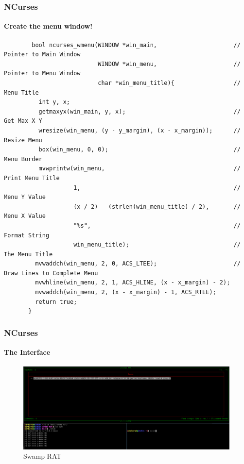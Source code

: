 \documentclass[aspectratio=169]{beamer}
\begin{document}
\begin{frame}[fragile]{}
  \frametitle{NCurses}
  \framesubtitle{Create the menu window!}
  \begin{center}
    \begin{tcolorbox}[title=net.c,colback=black]
    \begin{minipage}{0.5\textwidth}
      \begin{verbatim}
        bool ncurses_wmenu(WINDOW *win_main,                      // Pointer to Main Window
                           WINDOW *win_menu,                      // Pointer to Menu Window
                           char *win_menu_title){                 // Menu Title
          int y, x;
          getmaxyx(win_main, y, x);                               // Get Max X Y
          wresize(win_menu, (y - y_margin), (x - x_margin));      // Resize Menu
          box(win_menu, 0, 0);                                    // Menu Border
          mvwprintw(win_menu,                                     // Print Menu Title
                    1,                                            // Menu Y Value
                    (x / 2) - (strlen(win_menu_title) / 2),       // Menu X Value
                    "%s",                                         // Format String
                    win_menu_title);                              // The Menu Title
         mvwaddch(win_menu, 2, 0, ACS_LTEE);                      // Draw Lines to Complete Menu
         mvwhline(win_menu, 2, 1, ACS_HLINE, (x - x_margin) - 2);
         mvwaddch(win_menu, 2, (x - x_margin) - 1, ACS_RTEE);
         return true;
       }
      \end{verbatim}
    \end{minipage}
    \end{tcolorbox}
  \end{center}
\end{frame}

\begin{frame}
  \frametitle{NCurses}
  \framesubtitle{The Interface}
  \begin{center}
    \begin{figure}
      \includegraphics[width=14cm,keepaspectratio]{rat_tool}
      \caption{Swamp RAT}
    \end{figure}
  \end{center}
\end{frame}
\end{document}
